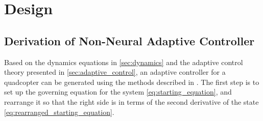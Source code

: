 \documentclass[letterpaper,12pt,titlepage,oneside,final]{book}
\begin{document}





\chapter{Design} \label{chap:implementation}

\section{Derivation of Non-Neural Adaptive Controller} \label{chap:nonneuraladaptive} %

Based on the dynamics equations in \autoref{sec:dynamics} and the adaptive control theory presented in \autoref{sec:adaptive_control}, an adaptive controller for a quadcopter can be generated using the methods described in \cite{cheah2006adaptive}. %
The first step is to set up the governing equation for the system \eqref{eq:starting_equation}, and rearrange it so that the right side is in terms of the second derivative of the state \eqref{eq:rearranged_starting_equation}.
\end{document}
